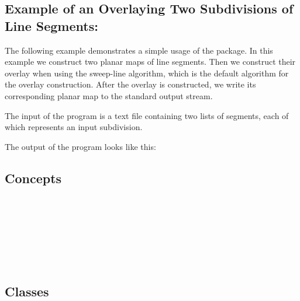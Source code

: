 \begin{ccTexOnly}
\subsection*{Example of an Overlaying Two Subdivisions of Line Segments:}
The following example demonstrates a simple usage of the 
 package.
In this example we construct two planar maps of line segments. 
Then we construct their overlay when using the sweep-line algorithm, which is 
the default algorithm for the overlay construction. 
After the overlay is constructed, we write its corresponding planar map to the 
standard output stream.

The input of the program is a text file containing two lists of segments, 
each of which represents an input subdivision.

The output of the program looks like this:

\subsection*{Concepts}
\\
\\
\\
\\
\\
\\

\subsection*{Classes}

\\
\\
\\
\\
\\

\end{ccTexOnly}    









